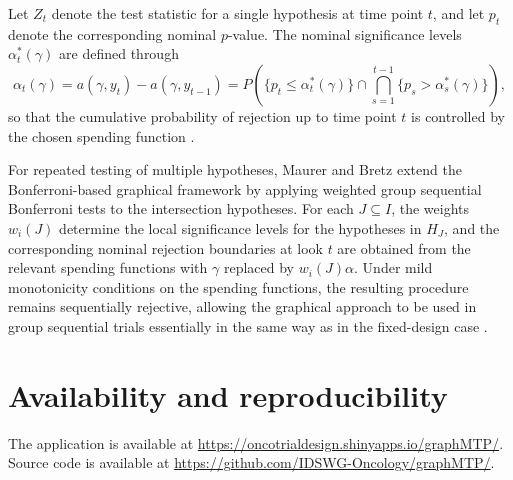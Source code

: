 \documentclass[article]{jss}
\begin{document}
Let $Z_t$ denote the test statistic for a single hypothesis at time point $t$,
and let $p_t$ denote the corresponding nominal $p$-value. The nominal
significance levels $\alpha_t^*(\gamma)$ are defined through
\[
\alpha_t(\gamma)
=
a(\gamma,y_t) - a(\gamma,y_{t-1})
=
P\left(
\{p_t \leq \alpha_t^*(\gamma)\}
\cap
\bigcap_{s=1}^{t-1}
\{p_s > \alpha_s^*(\gamma)\}
\right),
\]
so that the cumulative probability of rejection up to time point $t$ is
controlled by the chosen spending function \citep{LanDeMets1983,MaurerBretz2013}.

For repeated testing of multiple hypotheses, Maurer and Bretz extend the
Bonferroni-based graphical framework by applying weighted group sequential
Bonferroni tests to the intersection hypotheses. For each $J \subseteq I$, the
weights $w_i(J)$ determine the local significance levels for the hypotheses in
$H_J$, and the corresponding nominal rejection boundaries at look $t$ are
obtained from the relevant spending functions with $\gamma$ replaced by
$w_i(J)\alpha$. Under mild monotonicity conditions on the spending functions,
the resulting procedure remains sequentially rejective, allowing the graphical
approach to be used in group sequential trials essentially in the same way as
in the fixed-design case \citep{MaurerBretz2013}.



\section{Availability and reproducibility} \label{sec:availability}
The  application is available at
\url{https://oncotrialdesign.shinyapps.io/graphMTP/}.
Source code is available at
\url{https://github.com/IDSWG-Oncology/graphMTP/}.


\end{document}

